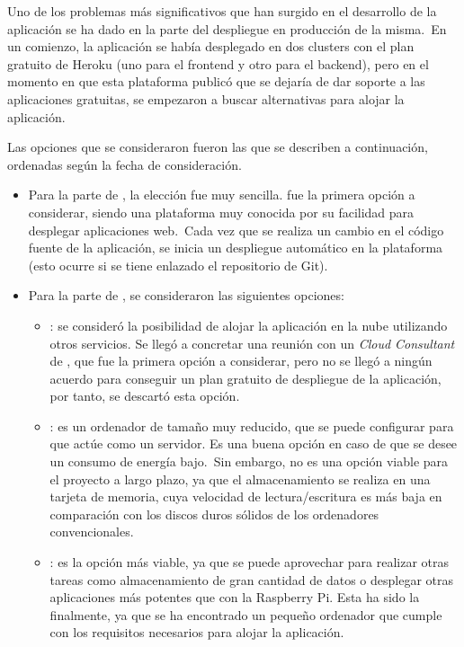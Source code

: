 Uno de los problemas más significativos que han surgido en el desarrollo de la aplicación se ha dado en la parte del
despliegue en producción de la misma.\ En un comienzo, la aplicación se había desplegado en dos clusters con el plan
gratuito de Heroku (uno para el frontend y otro para el backend), pero en el momento en que esta plataforma publicó
que se dejaría de dar soporte a las aplicaciones gratuitas, se empezaron a buscar alternativas para alojar la
aplicación.

Las opciones que se consideraron fueron las que se describen a continuación, ordenadas según la fecha de consideración.

\begin{itemize}
	\item Para la parte de , la elección fue muy sencilla.  fue la primera opción
	a considerar, siendo una plataforma muy conocida por su facilidad para desplegar aplicaciones web.\ Cada vez que se
	realiza un cambio en el código fuente de la aplicación, se inicia un despliegue automático en la plataforma (esto
	ocurre si se tiene enlazado el repositorio de Git).

	\item Para la parte de , se consideraron las siguientes opciones:
	\begin{itemize}
		\item {}: se consideró la posibilidad de alojar la aplicación en la nube
		utilizando otros servicios.
		Se llegó a concretar una reunión con un \textit{Cloud Consultant} de , que
		fue la primera opción a considerar, pero no se llegó a ningún acuerdo para conseguir un plan gratuito de
		despliegue de la aplicación, por tanto, se descartó esta opción.

		\item {}: es un ordenador de tamaño muy reducido, que se puede configurar para que
		actúe como un servidor.
		Es una buena opción en caso de que se desee un consumo de energía bajo.\ Sin embargo, no es una opción
		viable para el proyecto a largo plazo, ya que el almacenamiento se realiza en una tarjeta de memoria, cuya
		velocidad de lectura/escritura es más baja en comparación con los discos duros sólidos de los ordenadores
		convencionales.

		\item {}: es la opción más viable, ya que se puede aprovechar para realizar otras
		tareas como
		almacenamiento de gran cantidad de datos o desplegar otras aplicaciones más potentes que con la Raspberry Pi.
		Esta ha sido la  finalmente, ya que se ha encontrado un pequeño ordenador que cumple
		con los requisitos necesarios para alojar la aplicación.
	\end{itemize}
\end{itemize}

